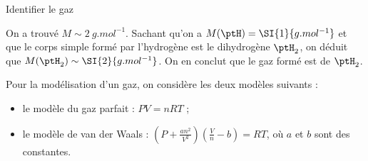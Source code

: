 \begin{enonce}
Identifier le gaz
\end{enonce}


\begin{corrige}
On a trouvé $M\sim \SI{2}{g.mol^{-1}}$. Sachant qu'on a $M(\ptH)=\SI{1}{g.mol^{-1}}$ et que le corps simple formé par l'hydrogène est le dihydrogène $\ptH_2$, on déduit que $M(\ptH_2)\sim \SI{2}{g.mol^{-1}}$. On en  conclut que le gaz formé est de $\ptH_2$. 
\end{corrige}



\finEntrainement





\hauteurLargeurCadreReponse		{10mm}{4.5cm}
\typeEntrainement				{} %
\initialisationEntrainement

Pour la modélisation d'un gaz, on considère les deux modèles suivants :

\begin{itemize}
\item le modèle du gaz parfait : $PV=nRT$ ;
\item le modèle de van der Waals : $\left(P+\frac{an^2}{V^2}\right)\left(\frac{V}{n}-b\right)=RT$, où $a$ et $b$ sont des constantes.
\end{itemize}

\debutEntrainement


